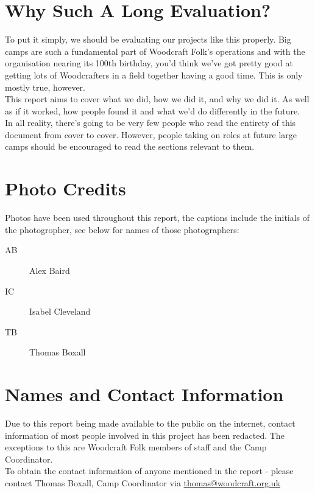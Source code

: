\section{Why Such A Long Evaluation?}
To put it simply, we should be evaluating our projects like this properly. Big camps are such a fundamental part of Woodcraft Folk's operations and with the organisation nearing its 100th birthday, you'd think we've got pretty good at getting lots of Woodcrafters in a field together having a good time. This is only mostly true, however.\\

This report aims to cover what we did, how we did it, and why we did it. As well as if it worked, how people found it and what we'd do differently in the future. \\

In all reality, there's going to be very few people who read the entirety of this document from cover to cover. However, people taking on roles at future large camps should be encouraged to read the sections relevant to them. 

\section{Photo Credits}
Photos have been used throughout this report, the captions include the initials of the photogropher, see below for names of those photographers:
\begin{description}
    \item[AB] Alex Baird
    \item[IC] Isabel Cleveland
    \item[TB] Thomas Boxall
\end{description}

\section{Names and Contact Information}
Due to this report being made available to the public on the internet, contact information of most people involved in this project has been redacted. The exceptions to this are Woodcraft Folk members of staff and the Camp Coordinator.\\

To obtain the contact information of anyone mentioned in the report - please contact Thomas Boxall, Camp Coordinator via \href{mailto:thomas@woodcraft.org.uk}{thomas@woodcraft.org.uk}
